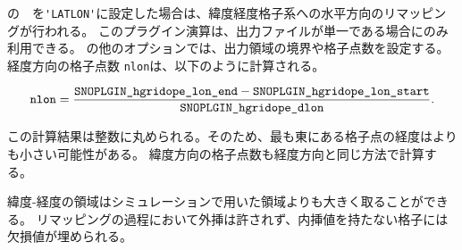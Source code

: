  の　を\verb|'LATLON'|に設定した場合は、緯度経度格子系への水平方向のリマッピングが行われる。
このプラグイン演算は、出力ファイルが単一である場合にのみ利用できる。
の他のオプションでは、出力領域の境界や格子点数を設定する。
経度方向の格子点数 \verb|nlon|は、以下のように計算される。

\begin{eqnarray}
  \nmitemeq{nlon} = \frac{\nmitemeq{SNOPLGIN_hgridope_lon_end} - \nmitemeq{SNOPLGIN_hgridope_lon_start} }{\nmitemeq{SNOPLGIN_hgridope_dlon}} \nonumber.
\end{eqnarray}

この計算結果は整数に丸められる。そのため、最も東にある格子点の経度はよりも小さい可能性がある。
緯度方向の格子点数も経度方向と同じ方法で計算する。

緯度-経度の領域はシミュレーションで用いた領域よりも大きく取ることができる。
リマッピングの過程において外挿は許されず、内挿値を持たない格子には欠損値が埋められる。
